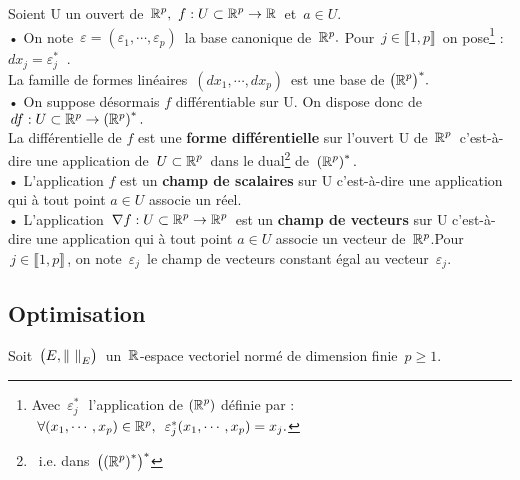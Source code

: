 Soient U un ouvert de \(\displaystyle\,\mathbb{R}^p,\ f:U\subset \mathbb{R}^p\to \mathbb{R}\,\) et \(\,a\in U\).\vspace{0.1cm}\\
• On note \(\,\varepsilon=(\varepsilon_1,\cdots,\varepsilon_p)\,\) la base canonique de \(\,\mathbb{R}^p.\) Pour \(\,j\in \llbracket 1,p \rrbracket\,\) on pose\footnote{Avec $\,\varepsilon_j^*\,\,$ l'application de $\displaystyle\left(\mathbb{R}^p\right)$\expo{*} définie par : \(\ \forall (x_1,\cdots,x_p)\in \mathbb{R}^p,\ \, \varepsilon_j^*(x_1,\cdots,x_p)=x_j.\)\vspace{0.2cm}} : \(dx_j=\varepsilon_j^*\ \) .\vspace{0.1cm}\\
La famille de formes linéaires \(\,(dx_1,\cdots,dx_p)\,\) est une base de \(\displaystyle \bigl(\mathbb{R}^p\bigr)^*.\)\vspace{0.2cm}\\
• On suppose désormais $f$ différentiable sur U. On dispose donc de \(\,df:U\subset\mathbb{R}^p \to \left(\mathbb{R}^p \right)^*.\,\)\\
La différentielle de $f$ est une \textbf{forme différentielle} sur l'ouvert U de $\displaystyle\,\mathbb{R}^p\,$ c'est-à-dire une application de \(\displaystyle \,U\subset \mathbb{R}^p\,\) dans le dual\footnote{\ i.e. dans \(\displaystyle\,\left(\left(\mathbb{R}^p\right)^*\right)^*\)} de \(\displaystyle\,\left(\mathbb{R}^p\right)^*.\)\vspace{0.2cm}\\
• L'application $f$ est un \textbf{champ de scalaires} sur U c'est-à-dire une application qui à tout point \(a\in U\) associe un réel.\vspace{0.2cm}\\
• L'application \(\displaystyle\,\nabla f:U\subset \mathbb{R}^p\to \mathbb{R}^p\,\) est un \textbf{champ de vecteurs} sur U c'est-à-dire une application qui à tout point \(a\in U\) associe un vecteur de \(\,\mathbb{R}^p\).Pour \(\, j\in \llbracket 1,p \rrbracket\,\), on note $\,\varepsilon_j\,$ le champ de vecteurs constant égal au vecteur $\,\varepsilon_j$.

\newpage

\subsection{Optimisation}

\vspace{0.9cm}

\begin{center}
    Soit \(\,\bigl(E,\left\lVert\ \right\rVert_E\bigr)\,\) un \(\,\mathbb{R}\)-espace vectoriel normé de dimension finie $\,p\geq 1$.
\end{center}

